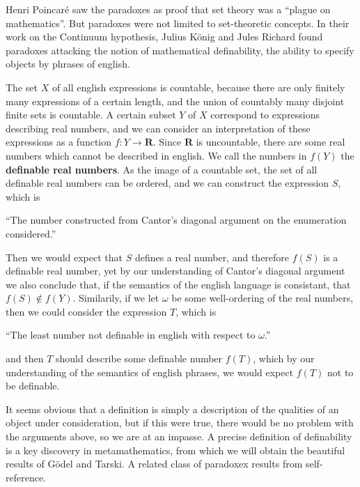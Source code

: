 Henri Poincar\'{e} saw the paradoxes as proof that set theory was a ``plague on mathematics''. But paradoxes were not limited to set-theoretic concepts. In their work on the Continuum hypothesis, Julius K\"{o}nig and Jules Richard found paradoxes attacking the notion of mathematical definability, the ability to specify objects by phrases of english.

\begin{example}
    The set $X$ of all english expressions is countable, because there are only finitely many expressions of a certain length, and the union of countably many disjoint finite sets is countable. A certain subset $Y$ of $X$ correspond to expressions describing real numbers, and we can consider an interpretation of these expressions as a function $f: Y \to \mathbf{R}$. Since $\mathbf{R}$ is uncountable, there are some real numbers which cannot be described in english. We call the numbers in $f(Y)$ the {\bf definable real numbers}. As the image of a countable set, the set of all definable real numbers can be ordered, and we can construct the expression $S$, which is
    \begin{center}
        ``The number constructed from Cantor's diagonal argument on the enumeration considered.''
    \end{center}
    Then we would expect that $S$ defines a real number, and therefore $f(S)$ is a definable real number, yet by our understanding of Cantor's diagonal argument we also conclude that, if the semantics of the english language is consistant, that $f(S) \not \in f(Y)$. Similarily, if we let $\omega$ be some well-ordering of the real numbers, then we could consider the expression $T$, which is
    \begin{center}
        ``The least number not definable in english with respect to $\omega$.''
    \end{center}
    and then $T$ should describe some definable number $f(T)$, which by our understanding of the semantics of english phrases, we would expect $f(T)$ not to be definable.
\end{example}

It seems obvious that a definition is simply a description of the qualities of an object under consideration, but if this were true, there would be no problem with the arguments above, so we are at an impasse. A precise definition of definability is a key discovery in metamathematics, from which we will obtain the beautiful results of G\"{o}del and Tarski. A related class of paradoxex results from self-reference.

